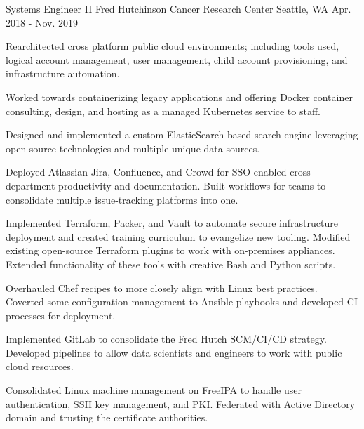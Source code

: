 \begin{cventries}
\cventry
{Systems Engineer II} %
{Fred Hutchinson Cancer Research Center} %
{Seattle, WA} %
{Apr. 2018 - Nov. 2019} %
{ %
\begin{cvitems}
\item {Rearchitected cross platform public cloud environments; including tools used, logical account management, user management, child account provisioning, and infrastructure automation.}
\item {Worked towards containerizing legacy applications and offering Docker container consulting, design, and hosting as a managed Kubernetes service to staff.}
\item {Designed and implemented a custom ElasticSearch-based search engine leveraging open source technologies and multiple unique data sources.}
\item {Deployed Atlassian Jira, Confluence, and Crowd for SSO enabled cross-department productivity and documentation. Built workflows for teams to consolidate multiple issue-tracking platforms into one. }
\item {Implemented Terraform, Packer, and Vault to automate secure infrastructure deployment and created training curriculum to evangelize new tooling. Modified existing open-source Terraform plugins to work with on-premises appliances. Extended functionality of these tools with creative Bash and Python scripts.}
\item {Overhauled Chef recipes to more closely align with Linux best practices. Coverted some configuration management to Ansible playbooks and developed CI processes for deployment.}
\item {Implemented GitLab to consolidate the Fred Hutch SCM/CI/CD strategy. Developed pipelines to allow data scientists and engineers to work with public cloud resources.}
\item {Consolidated Linux machine management on FreeIPA to handle user authentication, SSH key management, and PKI. Federated with Active Directory domain and trusting the certificate authorities. }
\end{cvitems}
}



\end{cventries}
